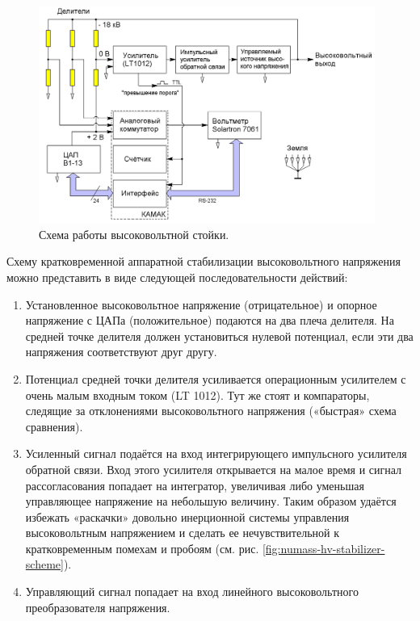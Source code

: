 \documentclass[a4paper,14pt]{extreport}
\begin{document}
\begin{figure}
  \centering
  \includegraphics[width = 0.98\textwidth]{img/nu_mass_setup/hv_scheme.png}
    \caption{Схема работы высоковольтной стойки.}
    \label{fig:numass-hv-scheme}
\end{figure}

Схему кратковременной аппаратной стабилизации высоковольтного напряжения можно представить в виде следующей последовательности действий:
\begin{enumerate}
    \item Установленное высоковольтное напряжение (отрицательное) и опорное напряжение с ЦАПа (положительное) подаются на два плеча делителя. На средней точке делителя должен установиться нулевой потенциал, если эти два напряжения соответствуют друг другу.
    \item Потенциал средней точки делителя усиливается операционным усилителем с очень малым входным током (LT 1012). Тут же стоят и компараторы, следящие за отклонениями высоковольтного напряжения («быстрая» схема сравнения).
    \item Усиленный сигнал подаётся на вход интегрирующего импульсного усилителя обратной связи. Вход этого усилителя открывается на малое время и сигнал рассогласования попадает на интегратор, увеличивая либо уменьшая управляющее напряжение на небольшую величину. Таким образом удаётся избежать «раскачки» довольно инерционной системы управления высоковольтным напряжением и сделать ее нечувствительной к кратковременным помехам и пробоям (см. рис. \ref{fig:numass-hv-stabilizer-scheme}).
    \item Управляющий сигнал попадает на вход линейного высоковольтного преобразователя напряжения.
\end{enumerate}
\end{document}
